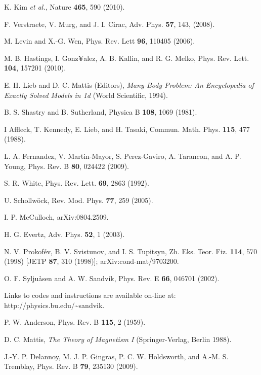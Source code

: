 \documentclass[draft,numberedheadings]{aipproc}
\begin{document}
\begin{thebibliography}{999}
K. Kim {\it et al.}, Nature {\bf 465}, 590 (2010). 

F. Verstraete, V. Murg, and J. I. Cirac, Adv. Phys. {\bf 57}, 143, (2008).

M. Levin and X.-G. Wen, Phys. Rev. Lett {\bf 96}, 110405 (2006).

M. B. Hastings, I. Gonz¥alez, A. B. Kallin, and R. G. Melko, Phys. Rev. Lett. {\bf 104}, 157201 (2010).

E. H. Lieb and D. C. Mattis (Editors), 
{\it Many-Body Problem: An Encyclopedia of Exactly Solved Models in 1d}
(World Scientific, 1994).

B. S. Shastry and B. Sutherland, Physica B {\bf 108}, 1069 (1981).

I Affleck, T. Kennedy, E. Lieb, and H. Tasaki, Commun. Math. Phys. {\bf 115}, 477 (1988).

L. A. Fernandez, V. Martin-Mayor, S. Perez-Gaviro, A. Tarancon, and A. P. Young, 
Phys. Rev. B {\bf 80}, 024422 (2009).

S. R. White, Phys. Rev. Lett. {\bf 69}, 2863 (1992).

U. Schollw\"ock, Rev. Mod. Phys. {\bf 77}, 259 (2005).

I. P. McCulloch, arXiv:0804.2509.

H. G. Evertz, Adv. Phys. {\bf 52}, 1 (2003).

N. V. Prokof\'ev, B. V. Svistunov, and I. S. Tupitsyn, Zh. Eks. Teor. Fiz. {\bf 114}, 570 (1998) 
[JETP {\bf 87}, 310 (1998)]; arXiv:cond-mat/9703200.

O. F. Sylju{\aa}sen and A. W. Sandvik, Phys. Rev. E {\bf 66}, 046701 (2002). 


Links to codes and instructions are available on-line at: http://physics.bu.edu/\~{ }sandvik.

P. W. Anderson, Phys. Rev. B {\bf 115}, 2 (1959).

D. C. Mattis, {\it The Theory of Magnetism I} (Springer-Verlag, Berlin 1988).

J.-Y. P. Delannoy, M. J. P. Gingras, P. C. W. Holdsworth, and A.-M. S. Tremblay,
Phys. Rev. B {\bf 79}, 235130 (2009).


\end{thebibliography}
\end{document}
